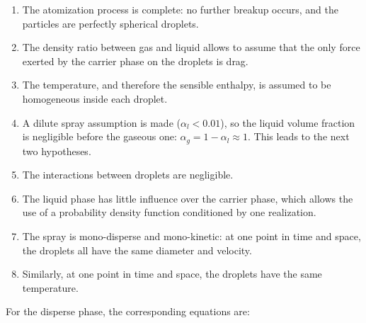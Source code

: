 \begin{enumerate}

\item The atomization process is complete: no further breakup occurs, and the particles are perfectly spherical droplets.

\item The density ratio between gas and liquid allows to assume that the only force exerted by the carrier phase on the droplets is drag.

\item The temperature, and therefore the sensible enthalpy, is assumed to be homogeneous inside each droplet.

\item A dilute spray assumption is made ($\alpha_l < 0.01$), so the liquid volume fraction is negligible before the gaseous one: $\alpha_g = 1 - \alpha_l \approx 1$. This leads to the next two hypotheses.

\item The interactions between droplets are negligible.

\item The liquid phase has little influence over the carrier phase, which allows the use of a probability density function conditioned by one realization.

\item The spray is mono-disperse and mono-kinetic: at one point in time and space, the droplets all have the same diameter and velocity.

\item Similarly, at one point in time and space, the droplets have the same temperature.


\end{enumerate}

For the disperse phase, the corresponding equations are:


